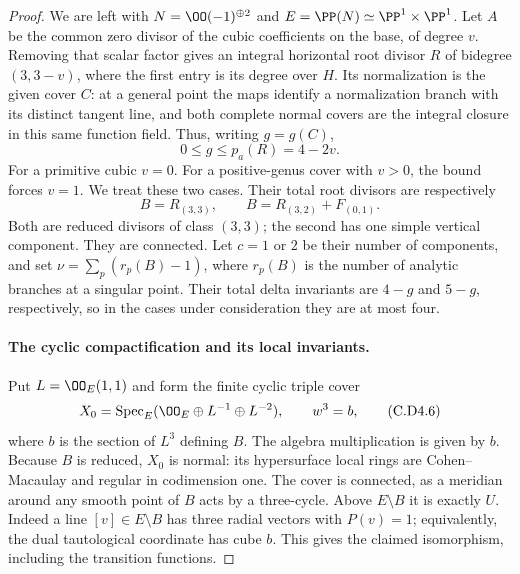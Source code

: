 \begin{proof}
We are left with $N=\OO(-1)^{\oplus2}$ and
$E=\PP(N)\simeq\PP^1\times\PP^1$. Let $A$ be the common
zero divisor of the cubic coefficients on the base, of degree
$v$. Removing that scalar factor gives an integral horizontal
root divisor $R$ of bidegree $(3,3-v)$, where the first entry
is its degree over $H$. Its normalization is the given
cover $C$: at a general point the maps identify a normalization
branch with its distinct tangent line, and both complete
normal covers are the integral closure in this same function
field. Thus, writing $g=g(C)$,
\[
                       0\le g\le p_a(R)=4-2v.
\tag{C.D4.4}
\]
For a primitive cubic $v=0$. For a positive-genus cover with
$v>0$, the bound forces $v=1$. We treat these two cases.
Their total root divisors are respectively
\[
 B=R_{(3,3)},\qquad
 B=R_{(3,2)}+F_{(0,1)}.
\tag{C.D4.5}
\]
Both are reduced divisors of class $(3,3)$; the second has
one simple vertical component. They are connected. Let
$c=1$ or $2$ be their number of components, and set
$\nu=\sum_p(r_p(B)-1)$, where $r_p(B)$ is the number of
analytic branches at a singular point. Their total delta
invariants are $4-g$ and $5-g$, respectively, so in the
cases under consideration they are at most four.

\paragraph{The cyclic compactification and its local invariants.}
Put $L=\OO_E(1,1)$ and form the finite cyclic triple cover
\[
 X_0=\operatorname{Spec}_E
       (\OO_E\oplus L^{-1}\oplus L^{-2}),\qquad w^3=b,
\tag{C.D4.6}
\]
where $b$ is the section of $L^3$ defining $B$. The algebra
multiplication is given by $b$. Because $B$ is reduced,
$X_0$ is normal: its hypersurface local rings are Cohen--Macaulay
and regular in codimension one. The cover is connected,
as a meridian around any smooth point of $B$ acts by a
three-cycle. Above $E\setminus B$ it is exactly $U$.
Indeed a line $[v]\in E\setminus B$ has three radial vectors
with $P(v)=1$; equivalently, the dual tautological coordinate
has cube $b$. This gives the claimed isomorphism, including
the transition functions.


\end{proof}
